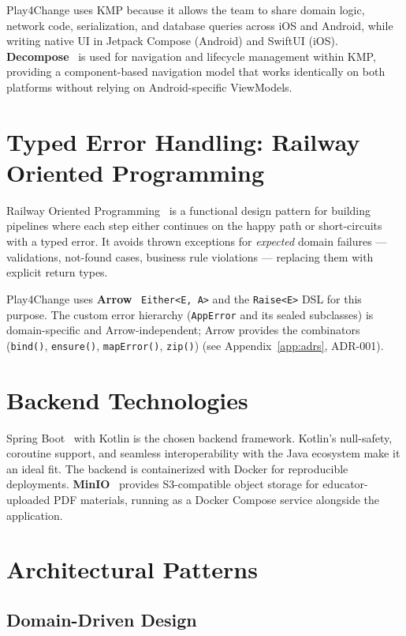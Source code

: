 Play4Change uses KMP because it allows the team to share domain logic, network code, serialization, and database queries across iOS and Android, while writing native UI in Jetpack Compose (Android) and SwiftUI (iOS). \textbf{Decompose}~\cite{decompose2024} is used for navigation and lifecycle management within KMP, providing a component-based navigation model that works identically on both platforms without relying on Android-specific ViewModels.

\section{Typed Error Handling: Railway Oriented Programming}
\label{sec:rop}

Railway Oriented Programming~\cite{wlaschin2014rop} is a functional design pattern for building pipelines where each step either continues on the happy path or short-circuits with a typed error. It avoids thrown exceptions for \emph{expected} domain failures — validations, not-found cases, business rule violations — replacing them with explicit return types.

Play4Change uses \textbf{Arrow}~\cite{arrowkt2024} \texttt{Either<E, A>} and the \texttt{Raise<E>} DSL for this purpose. The custom error hierarchy (\texttt{AppError} and its sealed subclasses) is domain-specific and Arrow-independent; Arrow provides the combinators (\texttt{bind()}, \texttt{ensure()}, \texttt{mapError()}, \texttt{zip()}) (see Appendix~\ref{app:adrs}, ADR-001).

\section{Backend Technologies}
\label{sec:backend}

Spring Boot~\cite{springboot2024} with Kotlin is the chosen backend framework. Kotlin's null-safety, coroutine support, and seamless interoperability with the Java ecosystem make it an ideal fit. The backend is containerized with Docker for reproducible deployments. \textbf{MinIO}~\cite{minio2024} provides S3-compatible object storage for educator-uploaded PDF materials, running as a Docker Compose service alongside the application.

\section{Architectural Patterns}
\label{sec:architecture_patterns}

\subsection{Domain-Driven Design}
\label{ssec:ddd}


